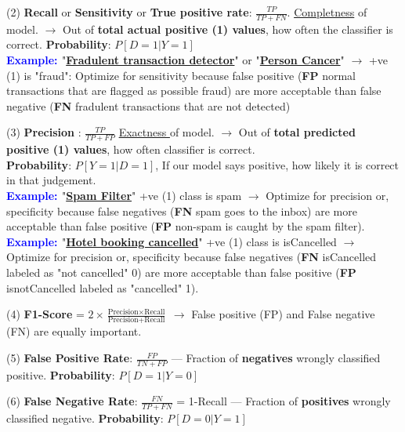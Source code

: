 \documentclass[letterpaper, 10.5pt,landscape]{article}
\begin{document}
\begin{multicols*}{3}
\vspace{2pt}

(2) \textbf{Recall} or \textbf{Sensitivity} or \textbf{True positive rate}: $\boxed{\frac{TP}{TP+FN}}$.  \underline{Completness} of model. $\rightarrow$ Out of \textbf{total actual positive (1) values}, how often the classifier is correct. \textbf{Probability}: $\boxed{P[D=1 | Y=1]}$ \\
    \textbf{\textcolor{blue}{Example: }} "\underline{\textbf{Fradulent transaction detector}}" or "\underline{\textbf{Person Cancer}}" $\rightarrow$ +ve (1) is "fraud": Optimize for sensitivity because false positive (\textbf{FP} normal transactions that are flagged as possible fraud) are more acceptable than false negative (\textbf{FN} fradulent transactions that are not detected) 

\vspace{2pt}

 (3) \textbf{Precision} : $\boxed{\frac{TP}{TP+FP}}$ \underline{Exactness } of model. $\rightarrow$ Out of \textbf{total predicted positive (1) values}, how often classifier is correct. \\ \textbf{Probability}: $\boxed{P[Y=1 | D=1]}$, If our model says positive, how likely it is correct in that judgement.\\
    \textbf{\textcolor{blue}{Example: }} "\underline{\textbf{Spam Filter}}" +ve (1) class is spam $\rightarrow$ Optimize for precision or, specificity because false negatives (\textbf{FN} spam goes to the inbox) are more acceptable than false positive (\textbf{FP} non-spam is caught by the spam filter).
    \textbf{\textcolor{blue}{Example: }} "\underline{\textbf{Hotel booking cancelled}}" +ve (1) class is isCancelled $\rightarrow$ Optimize for precision or, specificity because false negatives (\textbf{FN} isCancelled labeled as "not cancelled" 0) are more acceptable than false positive (\textbf{FP} isnotCancelled labeled as "cancelled" 1).

\vspace{2pt}
(4) \textbf{F1-Score } = $\boxed{2 \times \frac{\text{Precision} \times \text{Recall}}{\text{Precision} + \text{Recall}}}$  $\rightarrow$ False positive (FP) and False negative (FN) are equally important.
\vspace{2pt}

(5) \textbf{False Positive Rate}: \(\boxed{\frac{FP}{TN+FP}} \)  — Fraction of \textbf{negatives} wrongly classified positive.  \textbf{Probability}: $\boxed{P[D=1 | Y=0]}$

\vspace{2pt}
(6) \textbf{False Negative Rate}: \(\boxed{\frac{FN}{TP+FN}} \) = 1-Recall  — Fraction of \textbf{positives} wrongly classified negative.  \textbf{Probability}: $\boxed{P[D=0 | Y=1]}$


\end{multicols*}
\end{document}
